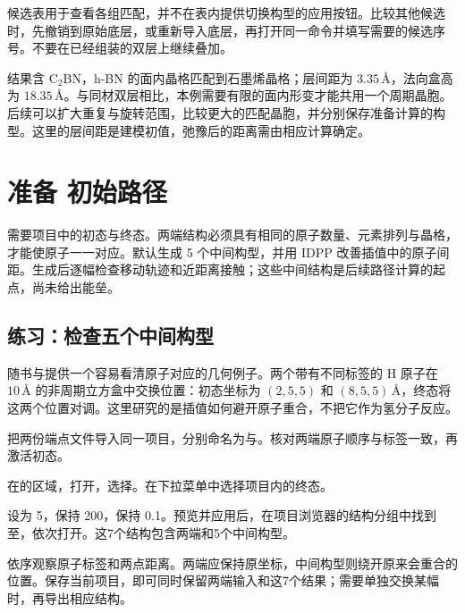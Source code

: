 候选表用于查看各组匹配，并不在表内提供切换构型的应用按钮。比较其他候选时，先撤销到原始底层，或重新导入底层，再打开同一命令并填写需要的候选序号。不要在已经组装的双层上继续叠加。

结果含 $\mathrm{C_2BN}$，h-BN 的面内晶格匹配到石墨烯晶格；层间距为 $3.35\,\text{\AA}$，法向盒高为 $18.35\,\text{\AA}$。与同材双层相比，本例需要有限的面内形变才能共用一个周期晶胞。后续可以扩大重复与旋转范围，比较更大的匹配晶胞，并分别保存准备计算的构型。这里的层间距是建模初值，弛豫后的距离需由相应计算确定。



\section{准备  初始路径}

需要项目中的初态与终态。两端结构必须具有相同的原子数量、元素排列与晶格，才能使原子一一对应。默认生成 5 个中间构型，并用 IDPP 改善插值中的原子间距。生成后逐幅检查移动轨迹和近距离接触；这些中间结构是后续路径计算的起点，尚未给出能垒。



\subsection{练习：检查五个中间构型}

随书与提供一个容易看清原子对应的几何例子。两个带有不同标签的 H 原子在 $10\,\text{\AA}$ 的非周期立方盒中交换位置：初态坐标为 $(2,5,5)$ 和 $(8,5,5)\,\text{\AA}$，终态将这两个位置对调。这里研究的是插值如何避开原子重合，不把它作为氢分子反应。

\begin{steps}
  \item 把两份端点文件导入同一项目，分别命名为与。核对两端原子顺序与标签一致，再激活初态。
  \item 在的区域，打开，选择。在下拉菜单中选择项目内的终态。
  \item {}设为 5，保持 200，保持 0.1。预览并应用后，在项目浏览器的结构分组中找到至，依次打开。这7个结构包含两端和5个中间构型。
  \item 依序观察原子标签和两点距离。两端应保持原坐标，中间构型则绕开原来会重合的位置。保存当前项目，即可同时保留两端输入和这7个结果；需要单独交换某幅时，再导出相应结构。
\end{steps}

